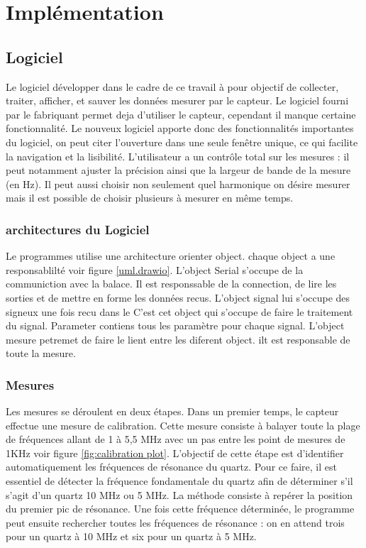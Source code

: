 \chapter{Implémentation}

\section{Logiciel}
Le logiciel développer dans le cadre de ce travail à pour objectif de collecter, traiter, afficher, et sauver les données mesurer par le capteur.
Le logiciel fourni par le fabriquant permet deja d'utiliser le capteur, cependant il manque certaine fonctionnalité. Le nouveux logiciel apporte donc des fonctionnalités  importantes du logiciel, on peut citer l’ouverture dans une seule fenêtre unique, ce qui facilite la navigation et la lisibilité.
L'utilisateur a un contrôle total sur les mesures : il peut notamment ajuster la précision ainsi que la largeur de bande de la mesure (en Hz).
Il peut aussi choisir non seulement quel harmonique on désire mesurer mais il est possible de choisir plusieurs à mesurer en même temps.

\subsection{architectures du Logiciel}
Le programmes utilise une architecture orienter object. chaque object a une responsablilté voir figure \ref{uml.drawio}. L'object Serial s'occupe de la communiction avec la balace. Il est responssable de la connection, de lire les sorties et de mettre en forme les données recus.
L'object signal lui s'occupe des signeux une fois recu dans le C'est cet object qui s'occupe de faire le traitement du signal. Parameter contiens tous les paramètre pour chaque signal. L'object mesure petremet de faire le lient entre les diferent object. ilt est responsable de toute la mesure. 


\subsection{Mesures}
Les mesures se déroulent en deux étapes.
Dans un premier temps, le capteur effectue une mesure de calibration. Cette mesure consiste à balayer toute la plage de fréquences allant de 1 à 5,5 MHz avec un pas entre les point de mesures de 1KHz voir figure \ref{fig:calibration plot}.
L’objectif de cette étape est d’identifier automatiquement les fréquences de résonance du quartz. Pour ce faire, il est essentiel de détecter la fréquence fondamentale du quartz afin de déterminer s’il s’agit d’un quartz 10 MHz ou 5 MHz.
La méthode consiste à repérer la position du premier pic de résonance. Une fois cette fréquence déterminée, le programme peut ensuite rechercher toutes les fréquences de résonance : on en attend trois pour un quartz à 10 MHz et six pour un quartz à 5 MHz.

